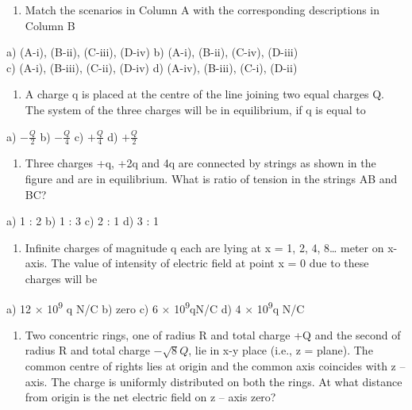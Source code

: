 \begin{enumerate}
\def\labelenumi{\arabic{enumi}.}
\setcounter{enumi}{15}
\item
  Match the scenarios in Column A with the corresponding descriptions in
  Column B
\end{enumerate}

a) (A-i), (B-ii), (C-iii), (D-iv) b) (A-i), (B-ii), (C-iv), (D-iii)\\
c) (A-i), (B-iii), (C-ii), (D-iv) d) (A-iv), (B-iii), (C-i), (D-ii)

\begin{enumerate}
\def\labelenumi{\arabic{enumi}.}
\setcounter{enumi}{16}
\item
  A charge q is placed at the centre of the line joining two equal
  charges Q. The system of the three charges will be in equilibrium, if
  q is equal to
\end{enumerate}

a) \(- \frac{Q}{2}\) b) \(- \frac{Q}{4}\) c) \(+ \frac{Q}{4}\) d)
\(+ \frac{Q}{2}\)

\begin{enumerate}
\def\labelenumi{\arabic{enumi}.}
\setcounter{enumi}{17}
\item
  Three charges +q, +2q and 4q are connected by strings as shown in the
  figure and are in equilibrium. What is ratio of tension in the strings
  AB and BC?
\end{enumerate}

a) 1 : 2 b) 1 : 3 c) 2 : 1 d) 3 : 1

\begin{enumerate}
\def\labelenumi{\arabic{enumi}.}
\setcounter{enumi}{18}
\item
  Infinite charges of magnitude q each are lying at x = 1, 2, 4,
  8\ldots{} meter on x- axis. The value of intensity of electric field
  at point x = 0 due to these charges will be
\end{enumerate}

a) 12 × 10\textsuperscript{9} q N/C b) zero c) 6 ×
10\textsuperscript{9}qN/C d) 4 × 10\textsuperscript{9}q N/C

\begin{enumerate}
\def\labelenumi{\arabic{enumi}.}
\setcounter{enumi}{19}
\item
  Two concentric rings, one of radius R and total charge +Q and the
  second of radius R and total charge \(- \sqrt{8}Q\), lie in x-y place
  (i.e., z = plane). The common centre of rights lies at origin and the
  common axis coincides with z -- axis. The charge is uniformly
  distributed on both the rings. At what distance from origin is the net
  electric field on z -- axis zero?
\end{enumerate}

